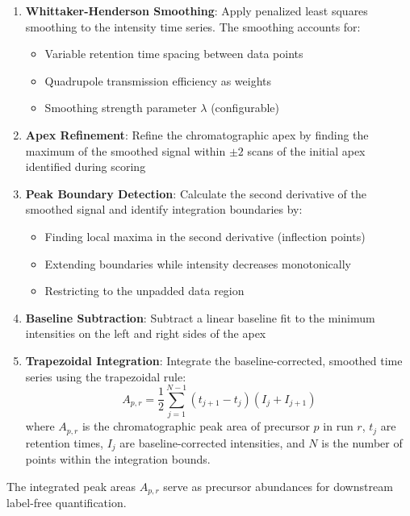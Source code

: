 \documentclass[pdflatex,sn-nature]{sn-jnl}
\begin{document}
\begin{enumerate}
    \item \textbf{Whittaker-Henderson Smoothing}: Apply penalized least squares smoothing \cite{Biessy2023-ix} to the intensity time series. The smoothing accounts for:
    \begin{itemize}
        \item Variable retention time spacing between data points
        \item Quadrupole transmission efficiency as weights
        \item Smoothing strength parameter $\lambda$ (configurable)
    \end{itemize}

    \item \textbf{Apex Refinement}: Refine the chromatographic apex by finding the maximum of the smoothed signal within $\pm 2$ scans of the initial apex identified during scoring

    \item \textbf{Peak Boundary Detection}: Calculate the second derivative of the smoothed signal and identify integration boundaries by:
    \begin{itemize}
        \item Finding local maxima in the second derivative (inflection points)
        \item Extending boundaries while intensity decreases monotonically
        \item Restricting to the unpadded data region
    \end{itemize}

    \item \textbf{Baseline Subtraction}: Subtract a linear baseline fit to the minimum intensities on the left and right sides of the apex

    \item \textbf{Trapezoidal Integration}: Integrate the baseline-corrected, smoothed time series using the trapezoidal rule:
    \begin{equation}
        A_{p,r} = \frac{1}{2}\sum_{j=1}^{N-1} (t_{j+1} - t_j)(I_j + I_{j+1})
    \end{equation}
    where $A_{p,r}$ is the chromatographic peak area of precursor $p$ in run $r$, $t_j$ are retention times, $I_j$ are baseline-corrected intensities, and $N$ is the number of points within the integration bounds.
\end{enumerate}

The integrated peak areas $A_{p,r}$ serve as precursor abundances for downstream label-free quantification.
\end{document}
